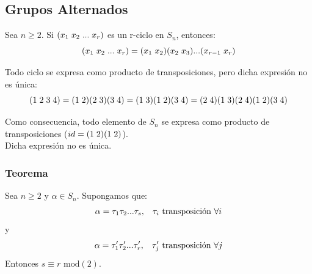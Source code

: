 \documentclass[11pt,a4paper]{article}
\begin{document}
\subsection{Grupos Alternados}

Sea $n \geq 2$. Si $(x_{1} \hspace{0.1cm} x_{2} \hspace{0.1cm} ... \hspace{0.1cm} x_{r})$ es un r-ciclo en $S_{n}$, entonces:
$$(x_{1} \hspace{0.1cm} x_{2} \hspace{0.1cm} ... \hspace{0.1cm} x_{r}) = (x_{1} \hspace{0.1cm} x_{2}) (x_{2} \hspace{0.1cm} x_{3}) ... (x_{r-1} \hspace{0.1cm} x_{r})$$

Todo ciclo se expresa como producto de transposiciones, pero dicha expresión no es única:
$$(1 \hspace{0.1cm} 2 \hspace{0.1cm} 3 \hspace{0.1cm} 4) = (1 \hspace{0.1cm} 2 )(2 \hspace{0.1cm} 3) (3 \hspace{0.1cm} 4) = (1 \hspace{0.1cm} 3) (1 \hspace{0.1cm} 2) (3 \hspace{0.1cm} 4) = (2 \hspace{0.1cm} 4) (1 \hspace{0.1cm} 3) (2 \hspace{0.1cm} 4) (1 \hspace{0.1cm} 2) (3 \hspace{0.1cm} 4)$$

Como consecuencia, todo elemento de $S_{n}$ se expresa como producto de transposiciones ($id = (1 \hspace{0.1cm} 2) (1 \hspace{0.1cm} 2)$). \\
Dicha expresión no es única.

\subsubsection*{Teorema}
 
Sea $n \geq 2$ y $\alpha \in S_{n}$. Supongamos que:
$$\alpha = \tau_{1} \tau_{2} ... \tau_{s}, \hspace{0.3cm} \tau_{i} \text{ transposición }\forall i$$
y
$$\alpha = \tau'_{1} \tau'_{2} ... \tau'_{r}, \hspace{0.3cm} \tau'_{j} \text{ transposición } \forall j$$
Entonces $s \equiv r \text{ mod}(2)$.
\end{document}
